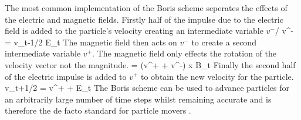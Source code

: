 The most common implementation of the Boris scheme seperates the effects of the electric and magnetic fields.
Firstly half of the impulse due to the electric field is added to the particle's velocity creating an intermediate variable $v^-$/
\be
v^- = v_{t-1/2}  E_t 
\ee
The magnetic field then acts on $v^-$ to create a second intermediate variable $v^+$. The magnetic field only effects the rotation of the velocity vector not the magnitude.
\be 
{} =  (v^+ + v^-) x B_t
\ee
Finally the second half of the electric impulse is added to $v^+$ to obtain the new velocity for the particle.
\be 
v_{t+1/2} =  v^+ +  E_t 
\ee
The Boris scheme can be used to advance particles for an arbitrarily large number of time steps whilst remaining accurate and is therefore the de facto standard for particle movers \cite{boris_good}. 




%
%

